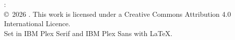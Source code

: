 \thispagestyle{empty}
\vspace*{\fill}
\begin{flushleft}\sffamily\footnotesize\color{inkmuted}
  \thesistitle: \thesissubtitle\\[0.8ex]
  \copyright\ 2026 \thesisauthor. This work is licensed under a Creative
  Commons Attribution 4.0 International Licence.\\[0.8ex]
  Set in IBM Plex Serif and IBM Plex Sans with \LaTeX.
\end{flushleft}
\cleardoublepage

